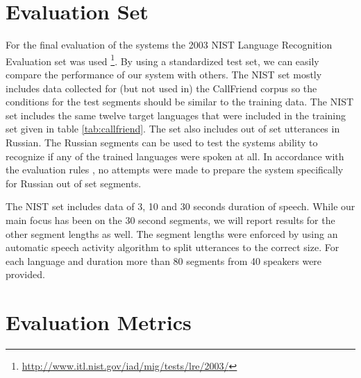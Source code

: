 \section{Evaluation Set}

For the final evaluation of the systems the 2003 NIST Language Recognition Evaluation set was used \footnote{\url{http://www.itl.nist.gov/iad/mig/tests/lre/2003/}}. By using a standardized test set, we can easily compare the performance of our system with others. The NIST set mostly includes data collected for (but not used in) the CallFriend corpus \cite{martin2003nist} so the conditions for the test segments should be similar to the training data. The NIST set includes the same twelve target languages that were included in the training set given in table \ref{tab:callfriend}. The set also includes out of set utterances in Russian. The Russian segments can be used to test the systems ability to recognize if any of the trained languages were spoken at all. In accordance with the evaluation rules \cite{martin2003nist}, no attempts were made to prepare the system specifically for Russian out of set segments.

The NIST set includes data of 3, 10 and 30 seconds duration of speech. While our main focus has been on the 30 second segments, we will report results for the other segment lengths as well. The segment lengths were enforced by using an automatic speech activity algorithm to split utterances to the correct size. For each language and duration more than 80 segments from 40 speakers were provided. 

\section{Evaluation Metrics}

